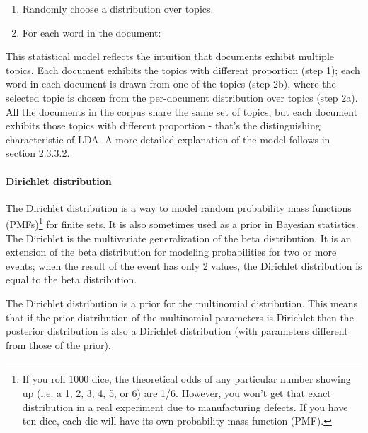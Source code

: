 \documentclass[12pt]{report}
\begin{document}
\begin{enumerate}
\item Randomly choose a distribution over topics.
\item For each word in the document:
\end{enumerate}


This statistical model reflects the intuition that documents exhibit multiple
topics. Each document exhibits the topics with different proportion (step 1);
each word in each document is drawn from one of the topics (step 2b), where the
selected topic is chosen from the per-document distribution over topics (step
2a). All the documents in the corpus share the same set of topics, but each
document exhibits those topics with different proportion - that’s the
distinguishing characteristic of LDA. A more detailed explanation of the model
follows in section 2.3.3.2.


\paragraph{Dirichlet distribution}


The Dirichlet distribution is a way to model random probability mass functions
(PMFs)\footnote{If you roll 1000 dice, the theoretical odds of any particular
number showing up (i.e. a 1, 2, 3, 4, 5, or 6) are 1/6. However, you won’t get
that exact distribution in a real experiment due to manufacturing defects. If
you have ten dice, each die will have its own probability mass function (PMF).}
for finite sets. It is also sometimes used as a prior in Bayesian statistics.
The Dirichlet is the multivariate generalization of the beta distribution. It
is an extension of the beta distribution for modeling probabilities for two or
more events; when the result of the event has only 2 values, the Dirichlet
distribution is equal to the beta distribution.


The Dirichlet distribution is a prior for the multinomial distribution. This
means that if the prior distribution of the multinomial parameters is Dirichlet
then the posterior distribution is also a Dirichlet distribution (with
parameters different from those of the prior).
\end{document}
